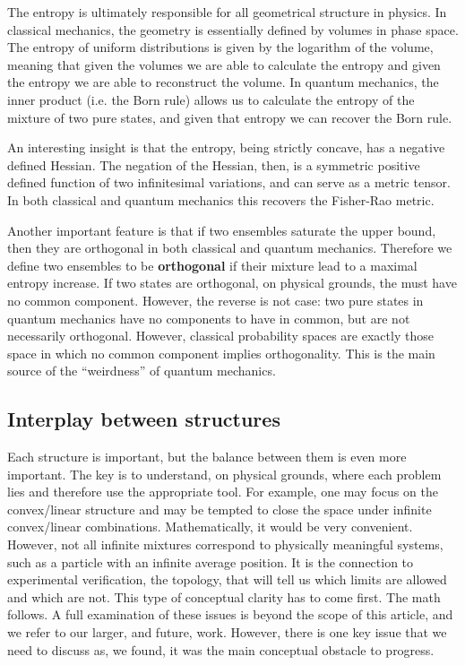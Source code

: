 \documentclass[10pt,twocolumn, nofootinbib]{revtex4-2}
\begin{document}
The entropy is ultimately responsible for all geometrical structure in physics. In classical mechanics, the geometry is essentially defined by volumes in phase space. The entropy of uniform distributions is given by the logarithm of the volume, meaning that given the volumes we are able to calculate the entropy and given the entropy we are able to reconstruct the volume. In quantum mechanics, the inner product (i.e. the Born rule) allows us to calculate the entropy of the mixture of two pure states, and given that entropy we can recover the Born rule.

An interesting insight is that the entropy, being strictly concave, has a negative defined Hessian. The negation of the Hessian, then, is a symmetric positive defined function of two infinitesimal variations, and can serve as a metric tensor. In both classical and quantum mechanics this recovers the Fisher-Rao metric.

Another important feature is that if two ensembles saturate the upper bound, then they are orthogonal in both classical and quantum mechanics. Therefore we define two ensembles to be \textbf{orthogonal} if their mixture lead to a maximal entropy increase. If two states are orthogonal, on physical grounds, the must have no common component. However, the reverse is not case: two pure states in quantum mechanics have no components to have in common, but are not necessarily orthogonal. However, classical probability spaces are exactly those space in which no common component implies orthogonality. This is the main source of the ``weirdness'' of quantum mechanics.

\subsection{Interplay between structures}

Each structure is important, but the balance between them is even more important. The key is to understand, on physical grounds, where each problem lies and therefore use the appropriate tool. For example, one may focus on the convex/linear structure and may be tempted to close the space under infinite convex/linear combinations. Mathematically, it would be very convenient. However, not all infinite mixtures correspond to physically meaningful systems, such as a particle with an infinite average position. It is the connection to experimental verification, the topology, that will tell us which limits are allowed and which are not. This type of conceptual clarity has to come first. The math follows. A full examination of these issues is beyond the scope of this article, and we refer to our larger, and future, work. However, there is one key issue that we need to discuss as, we found, it was the main conceptual obstacle to progress.
\end{document}
